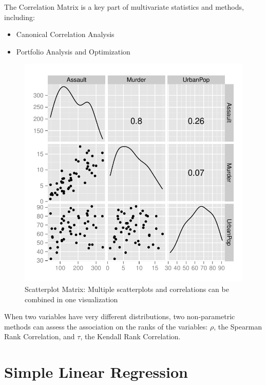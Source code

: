 \documentclass[nohyper,justified]{tufte-handout}\usepackage[]{graphicx}\usepackage[]{color}
\makeatletter
\def\maxwidth{ %
  \ifdim\Gin@nat@width>\linewidth
    \linewidth
  \else
    \Gin@nat@width
  \fi
}
\newenvironment{knitrout}{}{} %
\makeatother
\begin{document}
The Correlation Matrix is a key part of multivariate statistics and methods, including:
\begin{itemize}
  \item Canonical Correlation Analysis
  \item Portfolio Analysis and Optimization
\end{itemize}
\begin{knitrout}
\color{fgcolor}\begin{figure}

{\centering \includegraphics[width=\maxwidth]{figure/graphics-scatmat-1} 

}

\caption[Scatterplot Matrix]{Scatterplot Matrix: Multiple scatterplots and correlations can be combined in one visualization }\label{fig:scatmat}
\end{figure}


\end{knitrout}

When two variables have very different distributions, two non-parametric methods can assess the association on the ranks of the variables: $\rho$, the Spearman Rank Correlation, and $\tau$, the Kendall Rank Correlation.
\newpage
\section{Simple Linear Regression}
\end{document}
